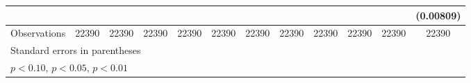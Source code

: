 \begin{table}[htbp]
\begin{tabular}{l*{11}{c}}
                    &                     &                     &                     &                     &                     &                     &                     &                     &                     &                     &   (0.00809)         \\
\midrule
Observations        &       22390         &       22390         &       22390         &       22390         &       22390         &       22390         &       22390         &       22390         &       22390         &       22390         &       22390         \\
\bottomrule
\multicolumn{12}{l}{\footnotesize Standard errors in parentheses}\\
\multicolumn{12}{l}{\footnotesize \sym{*} \(p<0.10\), \sym{**} \(p<0.05\), \sym{***} \(p<0.01\)}\\
\end{tabular}
\end{table}
